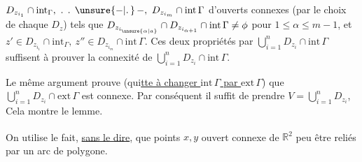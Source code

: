 $D_{z_{i_{1}}}\cap\mathrm{int}_{\Gamma},\ \ldotp\;\ldotp\;\unsure{-|\ldotp}\,{-},\ D_{z_{i_{m}}}\cap\mathrm{int}\,\Gamma$ d'ouverts connexes (par le choix de chaque $D_{z}$) tels que $D_{z_{i_{\unsure{\alpha|a}}}}\cap D_{z_{i_{\alpha+1}}}\cap\mathrm{int}\,\Gamma\ne\phi$ pour $1\le\alpha\le m-1$, et $z'\in D_{z_{i_{1}}}\cap\mathrm{int}_{\Gamma},\ z''\in D_{z_{i_{m}}}\cap\mathrm{int}\,\Gamma$. Ces deux propriétés  par $\bigcup\limits_{i=1}^{n}D_{z_{i}}\cap\mathrm{int}\,\Gamma$ suffisent à prouver la connexité de $\bigcup\limits_{i=1}^{n}D_{z_{i}}\cap\mathrm{int}\,\Gamma$.

\margin{!\ $\cdot$} Le même argument prouve (qui\uline{tte à changer $\mathrm{int}\,\Gamma$ par $\mathrm{ext}\,\Gamma$}) que $\bigcup\limits_{i=1}^{n}D_{z_{i}}\cap\mathrm{ext}\,\Gamma$ est connexe. Par conséquent il suffit de prendre $V=\bigcup\limits_{i=1}^{n}D_{z_{i}}$, Cela montre le lemme.

On\textsuperscript{\unsure{$*$}} utilise le fait, \uline{sans le dire}, que   points $x,y$   ouvert connexe de $\mathbb{R}^{2}$ peu être reliés par un arc de polygone.

